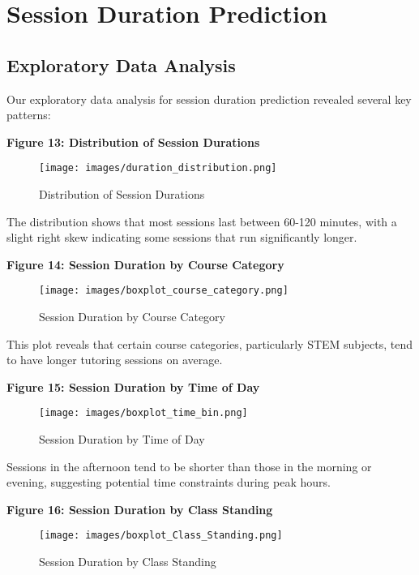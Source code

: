 \documentclass[12pt,letterpaper]{article}
\begin{document}
\section{Session Duration Prediction}

\subsection{Exploratory Data Analysis}

Our exploratory data analysis for session duration prediction revealed several key patterns:

\textbf{Figure 13: Distribution of Session Durations}

\begin{figure}[H]
    \centering
    \texttt{[image: images/duration\_distribution.png]}
    \caption{Distribution of Session Durations}
\end{figure}

The distribution shows that most sessions last between 60-120 minutes, with a slight right skew indicating some sessions that run significantly longer.

\textbf{Figure 14: Session Duration by Course Category}

\begin{figure}[H]
    \centering
    \texttt{[image: images/boxplot\_course\_category.png]}
    \caption{Session Duration by Course Category}
\end{figure}

This plot reveals that certain course categories, particularly STEM subjects, tend to have longer tutoring sessions on average.

\textbf{Figure 15: Session Duration by Time of Day}

\begin{figure}[H]
    \centering
    \texttt{[image: images/boxplot\_time\_bin.png]}
    \caption{Session Duration by Time of Day}
\end{figure}

Sessions in the afternoon tend to be shorter than those in the morning or evening, suggesting potential time constraints during peak hours.

\textbf{Figure 16: Session Duration by Class Standing}

\begin{figure}[H]
    \centering
    \texttt{[image: images/boxplot\_Class\_Standing.png]}
    \caption{Session Duration by Class Standing}
\end{figure}
\end{document}
